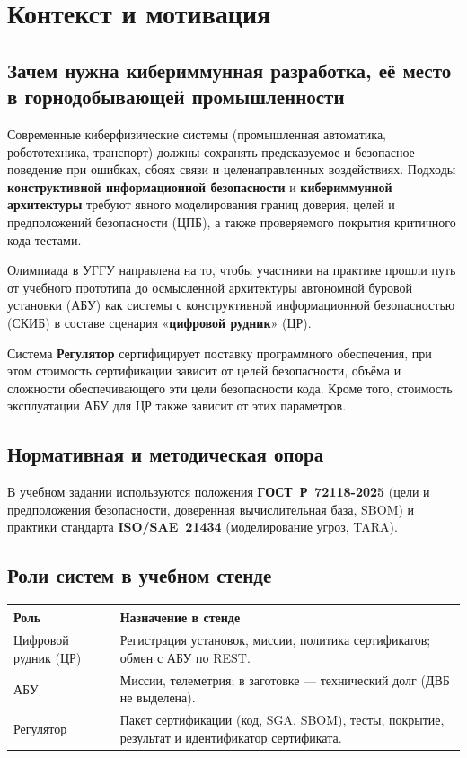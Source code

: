\chapter{Контекст и мотивация}
\label{ch:motivation}

\section{Зачем нужна кибериммунная разработка, её место в горнодобывающей промышленности}

Современные киберфизические системы (промышленная автоматика, робототехника, транспорт) должны сохранять предсказуемое и безопасное поведение при ошибках, сбоях связи и целенаправленных воздействиях. Подходы \textbf{конструктивной информационной безопасности} и \textbf{кибериммунной архитектуры} требуют явного моделирования границ доверия, целей и предположений безопасности (ЦПБ), а также проверяемого покрытия критичного кода тестами.

Олимпиада в УГГУ направлена на то, чтобы участники на практике прошли путь от учебного прототипа до осмысленной архитектуры автономной буровой установки (АБУ) как системы с конструктивной информационной безопасностью (СКИБ) в составе сценария «\textbf{цифровой рудник}» (ЦР). 

Система \textbf{Регулятор} сертифицирует поставку программного обеспечения, при этом стоимость сертификации зависит от целей безопасности, объёма и сложности обеспечивающего эти цели безопасности кода. Кроме того, стоимость эксплуатации АБУ для ЦР также зависит от этих параметров.  

\section{Нормативная и методическая опора}

В учебном задании используются положения \textbf{ГОСТ~Р~72118-2025} (цели и предположения безопасности, доверенная вычислительная база, SBOM) и практики стандарта \textbf{ISO/SAE~21434} (моделирование угроз, TARA).

\section{Роли систем в учебном стенде}
\label{sec:roles}

\begin{tabularx}{\textwidth}{@{}l X@{}}
\toprule
\textbf{Роль} & \textbf{Назначение в стенде} \\
\midrule
Цифровой рудник (ЦР) & Регистрация установок, миссии, политика сертификатов; обмен с АБУ по REST. \\
АБУ & Миссии, телеметрия; в заготовке --- технический долг (ДВБ не выделена). \\
Регулятор & Пакет сертификации (код, SGA, SBOM), тесты, покрытие, результат и идентификатор сертификата. \\
\bottomrule
\end{tabularx}

